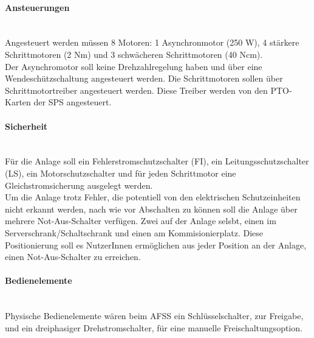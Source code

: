     \paragraph{Ansteuerungen}\mbox{}\\
    Angesteuert werden müssen 8 Motoren: 1 Asynchronmotor (250 W), 4 stärkere Schrittmotoren (2 Nm) und 3 schwächeren Schrittmotoren (40 Ncm). \\
    Der Asynchromotor soll keine Drehzahlregelung haben und über eine Wendeschützschaltung angesteuert werden. Die Schrittmotoren sollen über Schrittmotortreiber angesteuert werden. Diese Treiber werden von den PTO-Karten der SPS angesteuert.

    \paragraph{Sicherheit}\mbox{}\\
    Für die Anlage soll ein Fehlerstromschutzschalter (FI), ein Leitungsschutzschalter (LS), ein Motorschutzschalter und für jeden Schrittmotor eine Gleichstromsicherung ausgelegt werden.\\ 
    Um die Anlage trotz Fehler, die potentiell von den elektrischen Schutzeinheiten nicht erkannt werden, nach wie vor Abschalten zu können soll die Anlage über mehrere Not-Aus-Schalter verfügen. Zwei auf der Anlage selsbt, einen im Serverschrank/Schaltschrank und einen am Kommisionierplatz. Diese Positionierung soll es NutzerInnen ermöglichen aus jeder Position an der Anlage, einen Not-Aus-Schalter zu erreichen.

    \paragraph{Bedienelemente}\mbox{}\\
    Physische Bedienelemente wären beim AFSS ein Schlüsselschalter, zur Freigabe, und ein dreiphasiger Drehstromschalter, für eine manuelle Freischaltungsoption.

